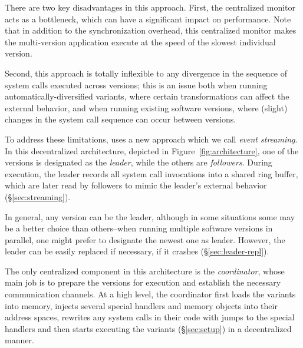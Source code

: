There are two key disadvantages in this approach.  First, the
centralized monitor acts as a bottleneck, which can have a significant
impact on performance.  Note that in addition to the synchronization overhead,
this centralized monitor makes the multi-version application execute at the
speed of the slowest individual version.

Second, this approach is totally inflexible to any divergence in the
sequence of system calls executed across versions; this is an issue
both when running automatically-diversified variants, where certain
transformations can affect the external behavior, and when running
existing software versions, where (slight) changes in the system call
sequence can occur between versions. %

To address these limitations, \nx uses a new approach which we call
\emph{event streaming}.  In this decentralized architecture,
depicted in Figure~\ref{fig:architecture}, one of the
versions is designated as the \textit{leader}, while the others are
\textit{followers}. During execution, the leader records all system
call invocations into a shared ring buffer, which are later read by
followers to mimic the leader's external behavior
(\S\ref{sec:streaming}).

In general, any version can be the leader, although in some situations
some may be a better choice than others--\eg when running multiple
software versions in parallel, one might prefer to designate the
newest one as leader.  However, the leader can be easily replaced if
necessary, \eg if it crashes (\S\ref{sec:leader-repl}).

The only centralized component in this architecture is the
\textit{coordinator}, whose main job is to prepare the versions for
execution and establish the necessary communication channels.  At a
high level, the coordinator first loads the variants into memory,
injects several special handlers and memory objects into their address
spaces, rewrites any system calls in their code with jumps to the
special handlers and then starts executing the variants
(\S\ref{sec:setup}) in a decentralized manner.



